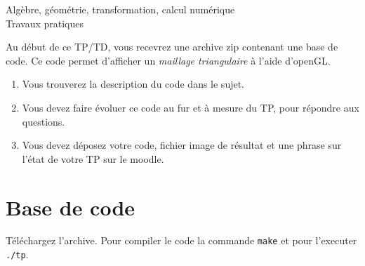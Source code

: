 \documentclass[a4paper,10pt]{article}
\newcommand\code[1]{\lstinline[columns=fixed]{#1}}
\begin{document}
\lstset{numbers=left, stepnumber=5, frame=single, basicstyle=\scriptsize, tabsize=2, showstringspaces=false}
\begin{center}
\LARGE{Algèbre, géométrie, transformation, calcul numérique}\\
\vspace*{0.4cm}
\normalsize{Travaux pratiques}
\end{center}

Au d\'ebut de ce TP/TD, vous recevrez une archive zip contenant une base de code.
Ce code permet d'afficher un \emph{maillage triangulaire} \`a l'aide d'openGL.
\begin{enumerate}
 \item Vous trouverez la description du code dans le sujet.
 \item Vous devez faire \'evoluer ce code au fur et \`a mesure du TP, pour r\'epondre aux questions.
 \item Vous devez déposez votre code, fichier image de résultat et une phrase sur l'état de votre TP sur le moodle.
\end{enumerate}


\section{Base de code}

T\'el\'echargez l'archive. Pour compiler le code la commande \code{make} et pour l'executer \code{./tp}.

% 
% 
% 
% 
% 
\end{document}
